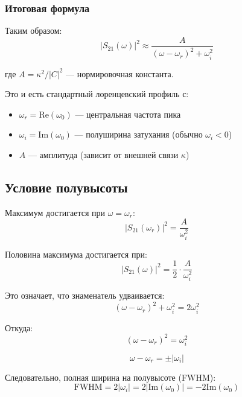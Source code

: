 \documentclass[12pt,a4paper]{article}
\begin{document}
\subsubsection{Итоговая формула}

Таким образом:
\begin{equation}
|S_{21}(\omega)|^2 \approx \frac{A}{(\omega - \omega_r)^2 + \omega_i^2}
\end{equation}

где $A = \kappa^2/|C|^2$ — нормировочная константа.

Это и есть стандартный лоренцевский профиль с:
\begin{itemize}
\item $\omega_r = \text{Re}(\omega_0)$ — центральная частота пика
\item $\omega_i = \text{Im}(\omega_0)$ — полуширина затухания (обычно $\omega_i < 0$)
\item $A$ — амплитуда (зависит от внешней связи $\kappa$)
\end{itemize}

\subsection{Условие полувысоты}

Максимум достигается при $\omega = \omega_r$:
\begin{equation}
|S_{21}(\omega_r)|^2 = \frac{A}{\omega_i^2}
\end{equation}

Половина максимума достигается при:
\begin{equation}
|S_{21}(\omega)|^2 = \frac{1}{2} \cdot \frac{A}{\omega_i^2}
\end{equation}

Это означает, что знаменатель удваивается:
\begin{equation}
(\omega - \omega_r)^2 + \omega_i^2 = 2\omega_i^2
\end{equation}

Откуда:
\begin{equation}
(\omega - \omega_r)^2 = \omega_i^2
\end{equation}

\begin{equation}
\omega - \omega_r = \pm|\omega_i|
\end{equation}

Следовательно, полная ширина на полувысоте (FWHM):
\begin{equation}
\boxed{\text{FWHM} = 2|\omega_i| = 2|\text{Im}(\omega_0)| = -2\text{Im}(\omega_0)}
\end{equation}
\end{document}
